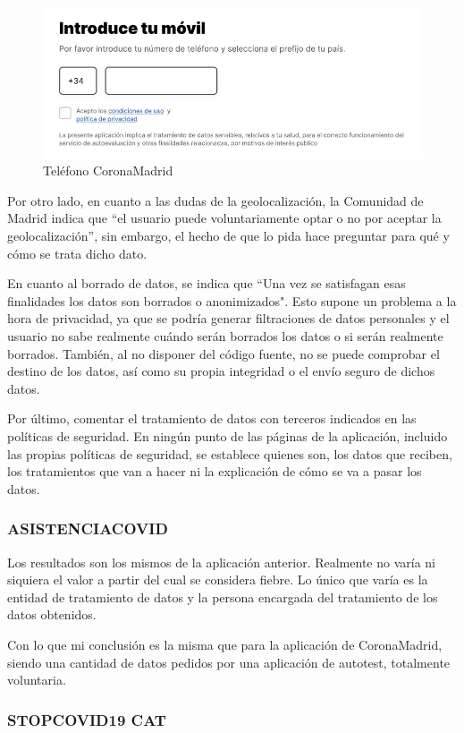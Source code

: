 \documentclass[11pt,a4paper,spanish]{article}
\begin{document}
\begin{figure}[h!]
  \centering
  \includegraphics[width=0.7\linewidth]{12.png} 
  \caption{Teléfono CoronaMadrid}
\end{figure}

Por otro lado, en cuanto a las dudas de la geolocalización, la Comunidad de Madrid indica que “el usuario puede voluntariamente optar o no por aceptar la geolocalización”, sin embargo, el hecho de que lo pida hace preguntar para qué y cómo se trata dicho dato.

En cuanto al borrado de datos, se indica que “Una vez se satisfagan esas finalidades los datos son borrados o anonimizados". Esto supone un problema a la hora de privacidad, ya que se podría generar filtraciones de datos personales y el usuario no sabe realmente cuándo serán borrados los datos o si serán realmente borrados. También, al no disponer del código fuente, no se puede comprobar el destino de los datos, así como su propia integridad o el envío seguro de dichos datos.

Por último, comentar el tratamiento de datos con terceros indicados en las políticas de seguridad. En ningún punto de las páginas de la aplicación, incluido las propias políticas de seguridad, se establece quienes son, los datos que reciben, los tratamientos que van a hacer ni la explicación de cómo se va a pasar los datos.

\subsubsection{ASISTENCIACOVID}

Los resultados son los mismos de la aplicación anterior. Realmente no varía ni siquiera el valor a partir del cual se considera fiebre. Lo único que varía es la entidad de tratamiento de datos y la persona encargada del tratamiento de los datos obtenidos. 

Con lo que mi conclusión es la misma que para la aplicación de CoronaMadrid, siendo una cantidad de datos pedidos por una aplicación de autotest, totalmente voluntaria.

\subsubsection{STOPCOVID19 CAT}
\end{document}
